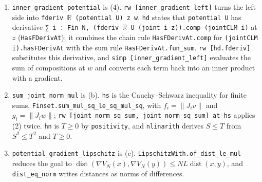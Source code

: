 \documentclass[11pt,a4paper]{report}
\begin{document}
\begin{leanbox}
\begin{enumerate}
\item \texttt{inner\_\allowbreak{}gradient\_\allowbreak{}potential} is (4). \texttt{rw [inner\_\allowbreak{}gradient\_\allowbreak{}left]} turns the left side into \texttt{fderiv \ensuremath{\mathbb R} (potential U) z w}. \texttt{hd} states that \texttt{potential U} has derivative \texttt{∑ i : Fin N, (fderiv \ensuremath{\mathbb R} U (joint i z)).\allowbreak{}comp (joint\allowbreak{}CLM i)} at \(z\) (\texttt{Has\allowbreak{}FDeriv\allowbreak{}At}); it combines the chain rule \texttt{Has\allowbreak{}FDeriv\allowbreak{}At.\allowbreak{}comp} for \texttt{(joint\allowbreak{}CLM i).\allowbreak{}has\allowbreak{}FDeriv\allowbreak{}At} with the sum rule \texttt{Has\allowbreak{}FDeriv\allowbreak{}At.\allowbreak{}fun\_\allowbreak{}sum}. \texttt{rw [hd.\allowbreak{}fderiv]} substitutes this derivative, and \texttt{simp [inner\_\allowbreak{}gradient\_\allowbreak{}left]} evaluates the sum of compositions at \(w\) and converts each term back into an inner product with a gradient.

\item \texttt{sum\_\allowbreak{}joint\_\allowbreak{}norm\_\allowbreak{}mul} is (b). \texttt{hs} is the Cauchy–Schwarz inequality for finite sums, \texttt{Finset.\allowbreak{}sum\_\allowbreak{}mul\_\allowbreak{}sq\_\allowbreak{}le\_\allowbreak{}sq\_\allowbreak{}mul\_\allowbreak{}sq}, with \(f_i=\|J_iv\|\) and \(g_i=\|J_iw\|\); \texttt{rw [joint\_\allowbreak{}norm\_\allowbreak{}sq\_\allowbreak{}sum, joint\_\allowbreak{}norm\_\allowbreak{}sq\_\allowbreak{}sum] at hs} applies (2) twice. \texttt{hn} is \(T\ge0\) by \texttt{positivity}, and \texttt{nlinarith} derives \(S\le T\) from \(S^2\le T^2\) and \(T\ge0\).

\item \texttt{potential\_\allowbreak{}gradient\_\allowbreak{}lipschitz} is (c). \texttt{Lipschitz\allowbreak{}With.\allowbreak{}of\_\allowbreak{}dist\_\allowbreak{}le\_\allowbreak{}mul} reduces the goal to \(\operatorname{dist}(\nabla V_N(x),\nabla V_N(y))\le NL\operatorname{dist}(x,y)\), and \texttt{dist\_\allowbreak{}eq\_\allowbreak{}norm} writes distances as norms of differences.

\begin{itemize}



\end{itemize}
\end{enumerate}
\end{leanbox}
\end{document}
